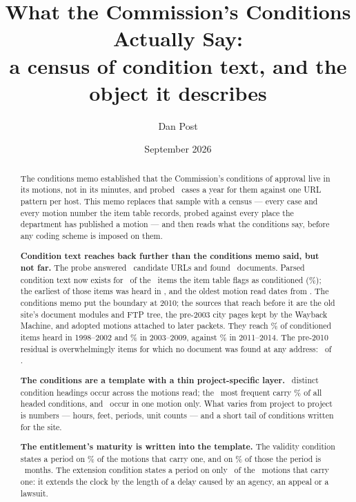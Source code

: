 \documentclass[11pt]{article}
\title{What the Commission's Conditions Actually Say:\\
\large a census of condition text, and the object it describes}
\author{Dan Post}
\date{September 2026}
\begin{document}
\maketitle

\begin{abstract}
\noindent
The conditions memo established that the Commission's conditions of approval live in its
motions, not in its minutes, and probed \ccOldPerYear\ cases a year for them against one URL
pattern per host. This memo replaces that sample with a census --- every case and every motion number
the item table records, probed against every place the department has published a motion ---
and then reads what the conditions say, before any coding scheme is imposed on them.

\medskip\noindent
\textbf{Condition text reaches back further than the conditions memo said, but not far.} The
probe answered \ccProbed\ candidate URLs and found \ccProbeHits\ documents. Parsed
condition text now exists for \ccCondWithText\ of the \ccCondItems\ items the item table flags
as conditioned (\ccCondWithTextPct\%); the earliest of those items was heard in
\ccEarliestItemYear, and the oldest motion read dates from \ccEarliestAny. The conditions memo
put the boundary at 2010; the sources
that reach before it are the old site's document modules and FTP tree, the pre-2003 city pages
kept by the Wayback Machine, and adopted motions attached to later packets. They reach \ccReachEarlyHtml\% of conditioned items
heard in 1998--2002 and \ccReachLateHtml\% in 2003--2009, against \ccReachEarlyPdf\% in
2011--2014. The pre-2010 residual is overwhelmingly items for which no document was found at
any address: \ccResPreTenNone\ of \ccResPreTen.

\medskip\noindent
\textbf{The conditions are a template with a thin project-specific layer.} \ccHeadingsDistinct\
distinct condition headings occur across the motions read; the \ccTopHeadings\ most frequent
carry \ccHeadingsTopShare\% of all headed conditions, and \ccHeadingsOnce\ occur in one motion
only. What varies from project to project is numbers --- hours, feet, periods, unit counts ---
and a short tail of conditions written for the site.

\medskip\noindent
\textbf{The entitlement's maturity is written into the template.} The validity condition
states a period on \ccValidityStatePct\% of the motions that carry one, and on
\ccValidityModalShare\% of those the period is \ccValidityModal\ months. The extension
condition states a period on only \ccExtensionWithPeriod\ of the \ccExtensionN\ motions that
carry one: it extends the clock by the length of a delay caused by an agency, an appeal or a
lawsuit.
\end{abstract}
\end{document}
